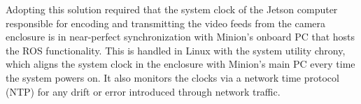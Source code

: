 \documentclass{erauthesis}
\begin{document}


Adopting this solution required that the system clock of the Jetson computer responsible for encoding and transmitting the video feeds from the camera enclosure is in near-perfect synchronization with Minion’s onboard PC that hosts the ROS functionality. 
This is handled in Linux with the system utility chrony, which aligns the system clock in the enclosure with Minion's main PC every time the system powers on.
It also monitors the clocks via a network time protocol (NTP) for any drift or error introduced through network traffic.


\end{document}
